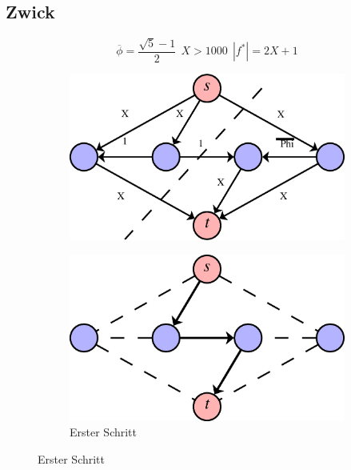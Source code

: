 \subsection{Zwick}
\[ \overline{\phi} = \frac{\sqrt{5}-1}{2}~~X>1000~~|f^*|=2X+1 \]
\begin{figure}[H]
	\centering
	\begin{subfigure}[H]{0.4\linewidth}
\centering
\includegraphics[width=\linewidth]{25/Grafik/Diagramm5}
\caption{}
\label{fig:Diagramm5}
\end{subfigure}
\begin{subfigure}[H]{0.3\linewidth}
\centering
\includegraphics[width=\linewidth]{25/Grafik/ersterSchritt}
\caption{Erster Schritt}
\label{fig:ersterSchritt}
\end{subfigure}
\end{figure}
